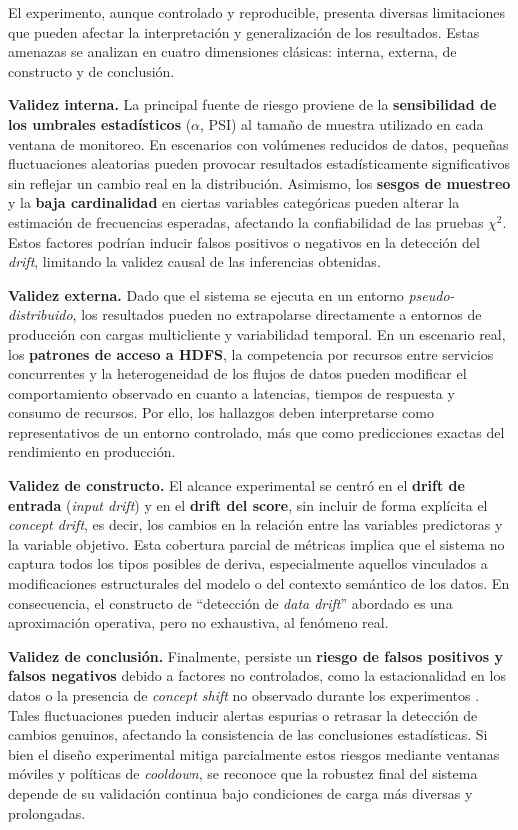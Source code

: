 El experimento, aunque controlado y reproducible, presenta diversas limitaciones que pueden afectar la interpretación y generalización de los resultados. Estas amenazas se analizan en cuatro dimensiones clásicas: interna, externa, de constructo y de conclusión.

\textbf{Validez interna.}  
La principal fuente de riesgo proviene de la \textbf{sensibilidad de los umbrales estadísticos} (\(\alpha\), PSI) al tamaño de muestra utilizado en cada ventana de monitoreo.  
En escenarios con volúmenes reducidos de datos, pequeñas fluctuaciones aleatorias pueden provocar resultados estadísticamente significativos sin reflejar un cambio real en la distribución.  
Asimismo, los \textbf{sesgos de muestreo} y la \textbf{baja cardinalidad} en ciertas variables categóricas pueden alterar la estimación de frecuencias esperadas, afectando la confiabilidad de las pruebas \(\chi^2\).  
Estos factores podrían inducir falsos positivos o negativos en la detección del \textit{drift}, limitando la validez causal de las inferencias obtenidas.

\textbf{Validez externa.}  
Dado que el sistema se ejecuta en un entorno \textit{pseudo-distribuido}, los resultados pueden no extrapolarse directamente a entornos de producción con cargas multicliente y variabilidad temporal.  
En un escenario real, los \textbf{patrones de acceso a HDFS}, la competencia por recursos entre servicios concurrentes y la heterogeneidad de los flujos de datos pueden modificar el comportamiento observado en cuanto a latencias, tiempos de respuesta y consumo de recursos.  
Por ello, los hallazgos deben interpretarse como representativos de un entorno controlado, más que como predicciones exactas del rendimiento en producción.

\textbf{Validez de constructo.}  
El alcance experimental se centró en el \textbf{drift de entrada} (\textit{input drift}) y en el \textbf{drift del score}, sin incluir de forma explícita el \textit{concept drift}, es decir, los cambios en la relación entre las variables predictoras y la variable objetivo.  
Esta cobertura parcial de métricas implica que el sistema no captura todos los tipos posibles de deriva, especialmente aquellos vinculados a modificaciones estructurales del modelo o del contexto semántico de los datos.  
En consecuencia, el constructo de “detección de \textit{data drift}” abordado es una aproximación operativa, pero no exhaustiva, al fenómeno real.

\textbf{Validez de conclusión.}  
Finalmente, persiste un \textbf{riesgo de falsos positivos y falsos negativos} debido a factores no controlados, como la estacionalidad en los datos o la presencia de \textit{concept shift} no observado durante los experimentos \citep{Widmer1996,Kolter2007,Sethi2017}.  
Tales fluctuaciones pueden inducir alertas espurias o retrasar la detección de cambios genuinos, afectando la consistencia de las conclusiones estadísticas.  
Si bien el diseño experimental mitiga parcialmente estos riesgos mediante ventanas móviles y políticas de \textit{cooldown}, se reconoce que la robustez final del sistema depende de su validación continua bajo condiciones de carga más diversas y prolongadas.


